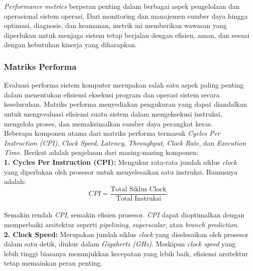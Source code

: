 \documentclass[12pt]{article}
\begin{document}
\hspace*{1cm} \textit{Performance metrics} berperan penting dalam berbagai aspek pengelolaan dan operasional sistem operasi. Dari monitoring dan manajemen sumber daya hingga optimasi, diagnosis, dan keamanan, metrik ini memberikan wawasan yang diperlukan untuk menjaga sistem tetap berjalan dengan efisien, aman, dan sesuai dengan kebutuhan kinerja yang diharapkan.

\subsubsection{Matriks Performa}
\label{subsec:performance_matrix}

\quad Evaluasi performa sistem komputer merupakan salah satu aspek paling penting dalam menentukan efisiensi eksekusi program dan operasi sistem secara keseluruhan. Matriks performa menyediakan pengukuran yang dapat diandalkan untuk mengevaluasi efisiensi suatu sistem dalam mengeksekusi instruksi, mengelola proses, dan memaksimalkan sumber daya perangkat keras.\\

Beberapa komponen utama dari matriks performa termasuk \textit{Cycles Per Instruction (CPI)}, \textit{Clock Speed}, \textit{Latency}, \textit{Throughput}, \textit{Clock Rate}, dan \textit{Execution Time}. Berikut adalah penjelasan dari masing-masing komponen:\\

\textbf{1. Cycles Per Instruction (CPI):} Mengukur rata-rata jumlah siklus \textit{clock} yang diperlukan oleh prosesor untuk menyelesaikan satu instruksi. Rumusnya adalah:\\

\begin{equation}
CPI = \frac{\text{Total Siklus Clock}}{\text{Total Instruksi}}
\end{equation}\\

Semakin rendah \textit{CPI}, semakin efisien prosesor. \textit{CPI} dapat dioptimalkan dengan memperbaiki arsitektur seperti \textit{pipelining}, \textit{superscalar}, atau \textit{branch prediction}.\\

\textbf{2. Clock Speed:} Merupakan jumlah siklus \textit{clock} yang diselesaikan oleh prosesor dalam satu detik, diukur dalam \textit{Gigahertz (GHz)}. Meskipun \textit{clock speed} yang lebih tinggi biasanya menunjukkan kecepatan yang lebih baik, efisiensi arsitektur tetap memainkan peran penting.\\
\end{document}
